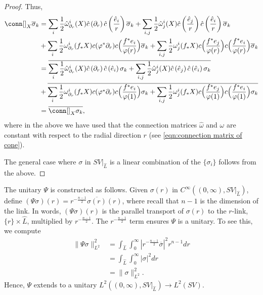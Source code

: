 \documentclass[12pt, reqno]{amsart}
\theoremstyle{plain} %
\theoremstyle{definition}
\theoremstyle{remark}
\numberwithin{equation}{section}
\newcommand{\dom}[1]{\hat{#1}}
\newcommand{\norm}[1]{\lVert #1 \rVert}
\newcommand{\pnorm}[1]{| #1 |}
\newcommand{\cbar}[1]{\dom{c}\left(#1\right)}
\begin{document}
\begin{proof}
    Thus,
    \begin{align*}
        \conn[]_X \overline{\sigma}_k &= \sum_i \frac{1}{2}\dom{\omega}_{\partial_r}^i(X) \cbar{\partial_r} \cbar{\frac{\dom{e}_i}{r}} \overline{\sigma}_k + \sum_{i,j} \frac{1}{2}\dom{\omega}_j^i(X) \cbar{\frac{\dom{e}_j}{r}} \cbar{\frac{\dom{e}_i}{r}} \overline{\sigma}_k \\
        &+ \sum_i \frac{1}{2} \omega_{\partial_r}^i(f_*X) c(\varphi^* \partial_r) c\Big(\frac{f^*e_i}{\varphi(r)}\Big) \overline{\sigma}_k + \sum_{i,j} \frac{1}{2} \omega_j^i(f_*X) c\Big(\frac{f^*e_j}{\varphi(r)}\Big) c\Big(\frac{f^*e_i}{\varphi(r)}\Big) \overline{\sigma}_k\\
        &= \overline{\sum_i \frac{1}{2} \dom{\omega}_{\partial_r}^i(X) \cbar{\partial_r} \cbar{\dom{e}_i} \sigma_k + \sum_{i,j} \frac{1}{2}\dom{\omega}_j^i(X) \cbar{\dom{e}_j} \cbar{\dom{e}_i} \sigma_k} \\
        &+ \overline{\sum_i \frac{1}{2} \omega_{\partial_r}^i(f_*X) c(\varphi^* \partial_r) c\Big(\frac{f^*e_i}{\varphi(1)}\Big) \sigma_k + \sum_{i,j} \frac{1}{2} \omega_j^i(f_*X) c\Big(\frac{f^*e_j}{\varphi(1)}\Big) c\Big(\frac{f^*e_i}{\varphi(1)}\Big) \sigma_k}\\
        &= \overline{\conn[]_X \sigma_k},
    \end{align*}
    where in the above we have used that the connection matrices \(\dom{\omega}\) and \(\omega\) are constant with respect to the radial direction \(r\) (see \eqref{eqn:connection matrix of cone}).

    The general case where \(\sigma\) in \(SV|_{\dom{L}}\) is a linear combination of the \(\{\sigma_i\}\) follows from the above.
\end{proof}

The unitary \(\Psi\) is constructed as follows.
Given \(\sigma(r)\) in \(C^{\infty}((0,\infty), SV|_{\dom{L}})\), define \((\Psi \sigma)(r) = r^{-\frac{n-1}{2}}\overline{\sigma(r)}(r)\), where recall that \(n-1\) is the dimension of the link.
In words, \((\Psi \sigma)(r)\) is the parallel transport of \(\sigma(r)\) to the \(r\)-link, \(\{r\} \times \dom{L}\), multiplied by \(r^{-\frac{n-1}{2}}\).
The \(r^{-\frac{n-1}{2}}\) term ensures \(\Psi\) is a unitary.
To see this, we compute
\begin{align*}
    \norm{\Psi \sigma}_{L^2}^2 &= \int_{\dom{L}} \int_{0}^{\infty} \pnorm{r^{-\frac{n-1}{2}} \overline{\sigma}}^2 r^{n-1} dr\\
    &= \int_{\dom{L}} \int_{0}^{\infty} \pnorm{\sigma}^2 dr\\
    &= \norm{\sigma}_{L^2}^2.
\end{align*}
Hence, \(\Psi\) extends to a unitary \(L^2((0, \infty), SV|_{\dom{L}}) \to L^2(SV)\).
\end{document}
